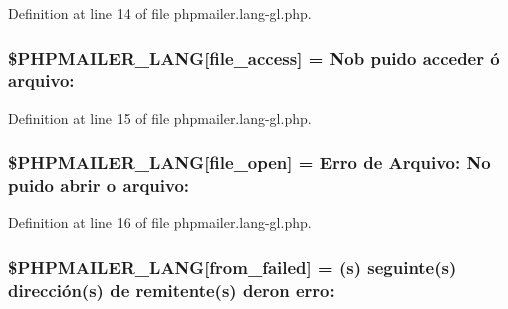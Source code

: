 Definition at line 14 of file phpmailer.\+lang-\/gl.\+php.

\subsubsection[{\texorpdfstring{\$\+P\+H\+P\+M\+A\+I\+L\+E\+R\+\_\+\+L\+A\+NG}{$PHPMAILER_LANG}}]{\setlength{\rightskip}{0pt plus 5cm}\$P\+H\+P\+M\+A\+I\+L\+E\+R\+\_\+\+L\+A\+NG\mbox{[}\textquotesingle{}file\+\_\+access\textquotesingle{}\mbox{]} = \textquotesingle{}Nob puido acceder ó arquivo\+: \textquotesingle{}}\hypertarget{phpmailer_8lang-gl_8php_a7e83349023b856ef9e5c46e30ae6d51e}{}\label{phpmailer_8lang-gl_8php_a7e83349023b856ef9e5c46e30ae6d51e}


Definition at line 15 of file phpmailer.\+lang-\/gl.\+php.

\subsubsection[{\texorpdfstring{\$\+P\+H\+P\+M\+A\+I\+L\+E\+R\+\_\+\+L\+A\+NG}{$PHPMAILER_LANG}}]{\setlength{\rightskip}{0pt plus 5cm}\$P\+H\+P\+M\+A\+I\+L\+E\+R\+\_\+\+L\+A\+NG\mbox{[}\textquotesingle{}file\+\_\+open\textquotesingle{}\mbox{]} = \textquotesingle{}Erro de Arquivo\+: No puido abrir {\bf o} arquivo\+: \textquotesingle{}}\hypertarget{phpmailer_8lang-gl_8php_a28d1a6517bf4c942a0ddd506188ad2e0}{}\label{phpmailer_8lang-gl_8php_a28d1a6517bf4c942a0ddd506188ad2e0}


Definition at line 16 of file phpmailer.\+lang-\/gl.\+php.

\subsubsection[{\texorpdfstring{\$\+P\+H\+P\+M\+A\+I\+L\+E\+R\+\_\+\+L\+A\+NG}{$PHPMAILER_LANG}}]{\setlength{\rightskip}{0pt plus 5cm}\$P\+H\+P\+M\+A\+I\+L\+E\+R\+\_\+\+L\+A\+NG\mbox{[}\textquotesingle{}from\+\_\+failed\textquotesingle{}\mbox{]} = ({\bf s}) seguinte({\bf s}) dirección({\bf s}) de remitente({\bf s}) deron erro\+: \textquotesingle{}}\hypertarget{phpmailer_8lang-gl_8php_adf832ae12155a09be077c6d5e4fd7e22}{}\label{phpmailer_8lang-gl_8php_adf832ae12155a09be077c6d5e4fd7e22}


